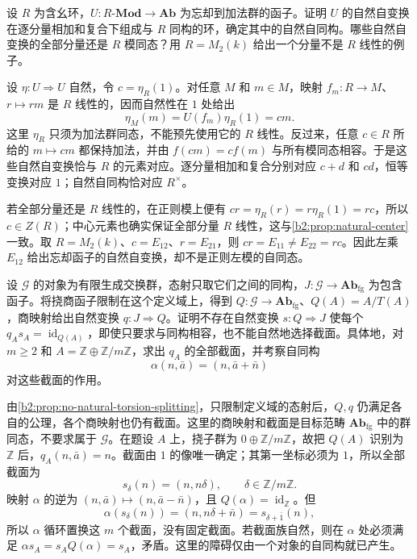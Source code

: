 \begin{exercise}\label{b2:ex:05-natural-center}
	设 \(R\) 为含幺环，\(U:R\text{-}\mathbf{Mod}\rightarrow\mathbf{Ab}\) 为忘却到加法群的函子。证明 \(U\) 的自然自变换在逐分量相加和复合下组成与 \(R\) 同构的环，确定其中的自然自同构。哪些自然自变换的全部分量还是 \(R\) 模同态？用 \(R=M_2(k)\) 给出一个分量不是 \(R\) 线性的例子。
\end{exercise}
\begin{solution}
	设 \(\eta:U\Rightarrow U\) 自然，令 \(c=\eta_R(1)\)。对任意 \(M\) 和 \(m\in M\)，映射 \(f_m:R\rightarrow M\)、\(r\mapsto rm\) 是 \(R\) 线性的，因而自然性在 \(1\) 处给出
	\[
		\eta_M(m)=U(f_m)\eta_R(1)=cm.
	\]
	这里 \(\eta_R\) 只须为加法群同态，不能预先使用它的 \(R\) 线性。反过来，任意 \(c\in R\) 所给的 \(m\mapsto cm\) 都保持加法，并由 \(f(cm)=cf(m)\) 与所有模同态相容。于是这些自然自变换恰与 \(R\) 的元素对应。逐分量相加和复合分别对应 \(c+d\) 和 \(cd\)，恒等变换对应 \(1\)；自然自同构恰对应 \(R^\times\)。

	若全部分量还是 \(R\) 线性的，在正则模上便有 \(cr=\eta_R(r)=r\eta_R(1)=rc\)，所以 \(c\in Z(R)\)；中心元素也确实保证全部分量 \(R\) 线性，这与\cref{b2:prop:natural-center}一致。取 \(R=M_2(k)\)、\(c=E_{12}\)、\(r=E_{21}\)，则 \(cr=E_{11}\ne E_{22}=rc\)。因此左乘 \(E_{12}\) 给出忘却函子的自然自变换，却不是正则左模的自同态。
\end{solution}

\begin{exercise}\label{b2:ex:05-no-natural-torsion-splitting}
	设 \(\mathcal G\) 的对象为有限生成交换群，态射只取它们之间的同构，\(J:\mathcal G\rightarrow\mathbf{Ab}_{\mathrm{fg}}\) 为包含函子。将挠商函子限制在这个定义域上，得到 \(Q:\mathcal G\rightarrow\mathbf{Ab}_{\mathrm{fg}}\)、\(Q(A)=A/T(A)\)，商映射给出自然变换 \(q:J\Rightarrow Q\)。证明不存在自然变换 \(s:Q\Rightarrow J\) 使每个 \(q_As_A=\operatorname{id}_{Q(A)}\)，即使只要求与同构相容，也不能自然地选择截面。具体地，对 \(m\ge2\) 和 \(A=\mathbb Z\oplus\mathbb Z/m\mathbb Z\)，求出 \(q_A\) 的全部截面，并考察自同构
	\[
		\alpha(n,\bar a)=(n,\bar a+\bar n)
	\]
	对这些截面的作用。
\end{exercise}
\begin{solution}
	由\cref{b2:prop:no-natural-torsion-splitting}，只限制定义域的态射后，\(Q,q\) 仍满足各自的公理，各个商映射也仍有截面。这里的商映射和截面是目标范畴 \(\mathbf{Ab}_{\mathrm{fg}}\) 中的群同态，不要求属于 \(\mathcal G\)。在题设 \(A\) 上，挠子群为 \(0\oplus\mathbb Z/m\mathbb Z\)，故把 \(Q(A)\) 识别为 \(\mathbb Z\) 后，\(q_A(n,\bar a)=n\)。截面由 \(1\) 的像唯一确定；其第一坐标必须为 \(1\)，所以全部截面为
	\[
		s_\delta(n)=(n,n\delta),\qquad \delta\in\mathbb Z/m\mathbb Z.
	\]
	映射 \(\alpha\) 的逆为 \((n,\bar a)\mapsto(n,\bar a-\bar n)\)，且 \(Q(\alpha)=\operatorname{id}_{\mathbb Z}\)。但
	\[
		\alpha(s_\delta(n))=(n,n\delta+\bar n)=s_{\delta+\bar1}(n),
	\]
	所以 \(\alpha\) 循环置换这 \(m\) 个截面，没有固定截面。若截面族自然，则在 \(\alpha\) 处必须满足 \(\alpha s_A=s_AQ(\alpha)=s_A\)，矛盾。这里的障碍仅由一个对象的自同构就已产生。
\end{solution}

